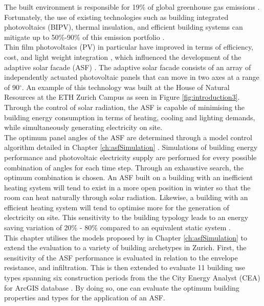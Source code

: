 
The built environment is responsible for 19\% of global greenhouse gas emissions \cite{IPCC}. Fortunately, the use of existing technologies such as building integrated photovoltaics (BIPV), thermal insulation, and efficient building systems can mitigate up to 50\%-90\% of this emission portfolio \cite{IPCC}.\\

Thin film photovoltaics (PV) in particular have improved in terms of efficiency, cost, and light weight integration \cite{NREL, kushiya2014cis, kaelin2004low, jelle2012building}, which influenced the development of the adaptive solar facade (ASF) \cite{nagy2016adaptive}. The adaptive solar facade consists of an array of independently actuated photovoltaic panels that can move in two axes at a range of 90$^{\circ}$. An example of this technology was built at the House of Natural Resources at the ETH Zurich Campus as seen in Figure \ref{fig:introduction3}. Through the control of solar radiation, the ASF is capable of minimising the building energy consumption in terms of heating, cooling and lighting demands, while simultaneously generating electricity on site.\\

The optimum panel angles of the ASF are determined through a model control algorithm detailed in Chapter  \ref{ch:asfSimulation} \cite{jayathissa2017AE}. Simulations of building energy performance and photovoltaic electricity supply are performed for every possible combination of angles for each time step. Through an exhaustive search, the optimum combination is chosen. An ASF built on a  building with an inefficient heating system will tend to exist in a more open position in winter so that the room can heat naturally through solar radiation. Likewise, a building with an efficient heating system will tend to optimise more for the generation of electricity on site. This sensitivity to the building typology leads to an energy saving variation of 20\% - 80\% compared to an equivalent static system \cite{jayathissa2017AE, jayathissa2016PVSEC}. \\

This chapter utilises the models proposed by in Chapter  \ref{ch:asfSimulation} to extend the evaluation to a variety of building archetypes in Zurich. First, the sensitivity of the ASF performance is evaluated in relation to the envelope resistance, and infiltration. This is then extended to evaluate 11 building use types spanning six construction periods from the the City Energy Analyst (CEA) for ArcGIS database \cite{fonseca2016city}. By doing so, one can evaluate the optimum building properties and types for the application of an ASF. \\


